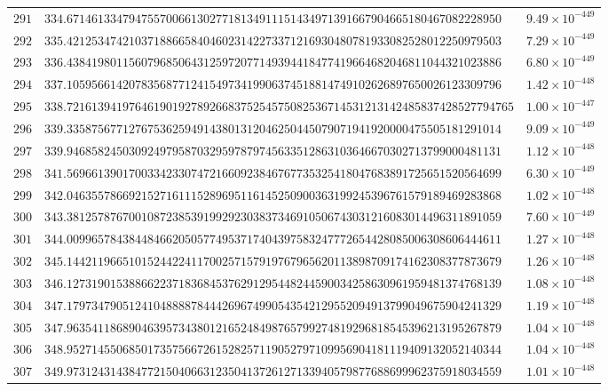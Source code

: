\documentclass[12pt,reqno]{amsart}
\theoremstyle{remark}
\begin{document}
\begin{longtable}{clc}
$291$ & $334.6714613347947557006613027718134911151434971391667904665180467082228950$ & $9.49\times 10^{-449}$ \\
$292$ & $335.4212534742103718866584046023142273371216930480781933082528012250979503$ & $7.29\times 10^{-449}$ \\
$293$ & $336.4384198011560796850643125972077149394418477419664682046811044321023886$ & $6.80\times 10^{-449}$ \\
$294$ & $337.1059566142078356877124154973419906374518814749102626897650026123309796$ & $1.42\times 10^{-448}$ \\
$295$ & $338.721613941976461901927892668375254575082536714531213142485837428527794765$ & $1.00\times 10^{-447}$ \\
$296$ & $339.3358756771276753625949143801312046250445079071941920000475505181291014$ & $9.09\times 10^{-449}$ \\
$297$ & $339.9468582450309249795870329597879745633512863103646670302713799000481131$ & $1.12\times 10^{-448}$ \\
$298$ & $341.5696613901700334233074721660923846767735325418047683891725651520564699$ & $6.30\times 10^{-449}$ \\
$299$ & $342.0463557866921527161115289695116145250900363199245396761579189469283868$ & $1.02\times 10^{-448}$ \\
$300$ & $343.3812578767001087238539199292303837346910506743031216083014496311891059$ & $7.60\times 10^{-449}$ \\
$301$ & $344.0099657843844846620505774953717404397583247772654428085006308606444611$ & $1.27\times 10^{-448}$ \\
$302$ & $345.1442119665101524422411700257157919767965620113898709174162308377873679$ & $1.26\times 10^{-448}$ \\
$303$ & $346.1273190153886622371836845376291295448244590034258630961959481374768139$ & $1.08\times 10^{-448}$ \\
$304$ & $347.1797347905124104888878444269674990543542129552094913799049675904241329$ & $1.19\times 10^{-448}$ \\
$305$ & $347.9635411868904639573438012165248498765799274819296818545396213195267879$ & $1.04\times 10^{-448}$ \\
$306$ & $348.9527145506850173575667261528257119052797109956904181119409132052140344$ & $1.04\times 10^{-448}$ \\
$307$ & $349.9731243143847721504066312350413726127133940579877688699962375918034559$ & $1.01\times 10^{-448}$ \\

\end{longtable}
\end{document}
